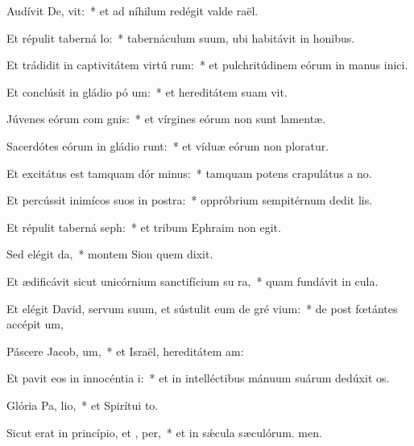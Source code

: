 \item Audívit De,  vit:~* et ad níhilum redégit valde raël.
\item Et répulit taberná lo:~* tabernáculum suum, ubi habitávit in honibus.
\item Et trádidit in captivitátem virtú rum:~* et pulchritúdinem eórum in manus inici.
\item Et conclúsit in gládio pó um:~* et hereditátem suam vit.
\item Júvenes eórum com gnis:~* et vírgines eórum non sunt lamentæ.
\item Sacerdótes eórum in gládio runt:~* et víduæ eórum non ploratur.
\item Et excitátus est tamquam dór minus:~* tamquam potens crapulátus a no.
\item Et percússit inimícos suos in postra:~* oppróbrium sempitérnum dedit lis.
\item Et répulit taberná seph:~* et tribum Ephraim non egit.
\item Sed elégit  da,~* montem Sion quem dixit.
\item Et ædificávit sicut unicórnium sanctifícium su  ra,~* quam fundávit in cula.
\item Et elégit David, servum suum, et sústulit eum de gré vium:~* de post fœtántes accépit um,
\item Páscere Jacob,  um,~* et Israël, hereditátem am:
\item Et pavit eos in innocéntia  i:~* et in intelléctibus mánuum suárum dedúxit os.
\item Glória Pa,  lio,~* et Spirítui to.
\item Sicut erat in princípio, et ,  per,~* et in sǽcula sæculórum. men.
